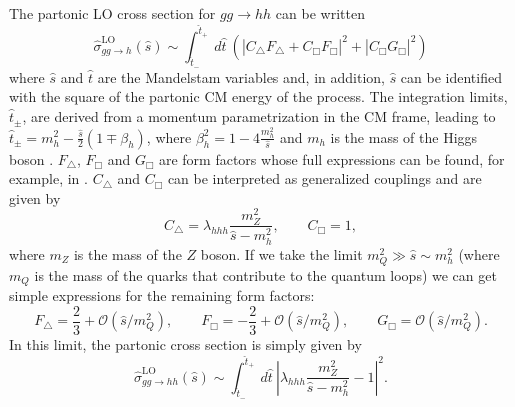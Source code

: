 The partonic LO cross section for $gg\rightarrow hh$ can be written
\begin{equation}
\hat{\sigma}^{\text{LO}}_{gg\rightarrow h} (\hat{s}) \sim \int_{\hat{t}_-}^{\hat{t}_+}~d\hat{t}~\left(|C_{\bigtriangleup}F_{\bigtriangleup}+C_{\Box}F_{\Box}|^2+|C_{\Box}G_{\Box}|^2\right)
\end{equation}
where $\hat{s}$ and $\hat{t}$ are the Mandelstam variables and, in addition, $\hat{s}$ can be identified with the square of the partonic CM energy of the process. The integration limits, $\hat{t}_{\pm}$, are derived from a momentum parametrization in the CM frame, leading to $\hat{t}_{\pm}=m_h^2-\frac{\hat{s}}{2}(1\mp \beta_h)$, where $\beta_h^2=1-4\frac{m_h^2}{\hat{s}}$ and $m_h$ is the mass of the Higgs boson \cite{HHxs_LO1}. $F_{\bigtriangleup}$, $F_{\Box}$ and $G_{\Box}$ are form factors whose full expressions can be found, for example, in \cite{HHxs_LO}. $C_{\bigtriangleup}$ and $C_{\Box}$ can be interpreted as generalized couplings and are given by
\begin{equation}
C_{\bigtriangleup}=\lambda_{hhh}\frac{m_Z^2}{\hat{s}-m_h^2}, \qquad C_{\Box}=1,
\end{equation}
where $m_Z$ is the mass of the $Z$ boson.
If we take the limit $m_Q^2 \gg \hat{s}\sim m_h^2$ (where $m_Q$ is the mass of the quarks that contribute to the quantum loops) we can get simple expressions for the remaining form factors:
\begin{equation}
F_{\bigtriangleup}=\frac{2}{3} + \mathcal{O}(\hat{s}/m_Q^2), \qquad F_{\Box}=-\frac{2}{3} + \mathcal{O}(\hat{s}/m_Q^2), \qquad G_{\Box}=\mathcal{O}(\hat{s}/m_Q^2).
\end{equation}
In this limit, the partonic cross section is simply given by 
\begin{equation}
\hat{\sigma}^{\text{LO}}_{gg\rightarrow hh}(\hat{s}) \sim \int_{\hat{t}_-}^{\hat{t}_+}~d\hat{t}~ |\lambda_{hhh}\frac{m_Z^2}{\hat{s}-m_h^2}-1|^2.
\label{eq:xsparton}
\end{equation}

%

